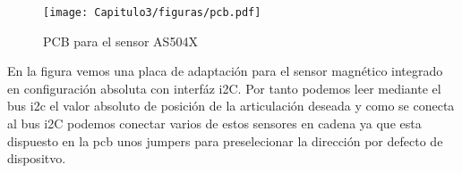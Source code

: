 \begin{figure}[htbp]
    \texttt{[image: Capitulo3/figuras/pcb.pdf]}
    \caption{PCB para el sensor AS504X}
    \end{figure}

En la figura  vemos una placa de adaptación para el sensor magnético integrado en configuración absoluta con interfáz i2C.
Por tanto podemos leer mediante el bus i2c el valor absoluto de posición de la articulación deseada y como se conecta al bus i2C podemos
conectar varios de estos sensores en cadena ya que esta dispuesto en la pcb unos jumpers para preselecionar la dirección por defecto de dispositvo.

















